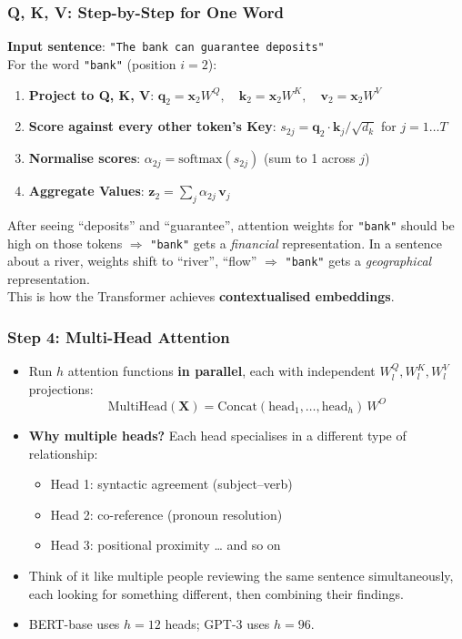 \begin{frame}[fragile]\frametitle{Q, K, V: Step-by-Step for One Word}
\textbf{Input sentence}: \texttt{"The bank can guarantee deposits"}\\[0.4em]
For the word \texttt{"bank"} (position $i = 2$):
\begin{enumerate}
\item \textbf{Project to Q, K, V}:
      $\mathbf{q}_2 = \mathbf{x}_2 W^Q,\quad
       \mathbf{k}_2 = \mathbf{x}_2 W^K,\quad
       \mathbf{v}_2 = \mathbf{x}_2 W^V$
\item \textbf{Score against every other token's Key}:
      $s_{2j} = \mathbf{q}_2 \cdot \mathbf{k}_j / \sqrt{d_k}$
      for $j = 1 \ldots T$
\item \textbf{Normalise scores}: $\alpha_{2j} = \text{softmax}(s_{2j})$
      \hfill {\small (sum to 1 across $j$)}
\item \textbf{Aggregate Values}:
      $\mathbf{z}_2 = \sum_j \alpha_{2j}\,\mathbf{v}_j$
\end{enumerate}
\vspace{0.3em}
After seeing ``deposits'' and ``guarantee'', attention weights for \texttt{"bank"} should
be high on those tokens $\Rightarrow$ \texttt{"bank"} gets a \emph{financial} representation.
In a sentence about a river, weights shift to ``river'', ``flow'' $\Rightarrow$
\texttt{"bank"} gets a \emph{geographical} representation.\\[0.3em]
This is how the Transformer achieves \textbf{contextualised embeddings}.
\end{frame}


\begin{frame}[fragile]\frametitle{Step 4: Multi-Head Attention}
\begin{itemize}
\item Run $h$ attention functions \textbf{in parallel}, each with independent $W^Q_l, W^K_l, W^V_l$ projections:
\[
  \text{MultiHead}(\mathbf{X}) = \text{Concat}(\text{head}_1, \ldots, \text{head}_h)\,W^O
\]
\item \textbf{Why multiple heads?} Each head specialises in a different type of relationship:
  \begin{itemize}
  \item Head 1: syntactic agreement (subject–verb)
  \item Head 2: co-reference (pronoun resolution)
  \item Head 3: positional proximity … and so on
  \end{itemize}
\item Think of it like multiple people reviewing the same sentence simultaneously, each looking for something different,  then combining their findings.
\item BERT-base uses $h=12$ heads; GPT-3 uses $h=96$.
\end{itemize}
\end{frame}



